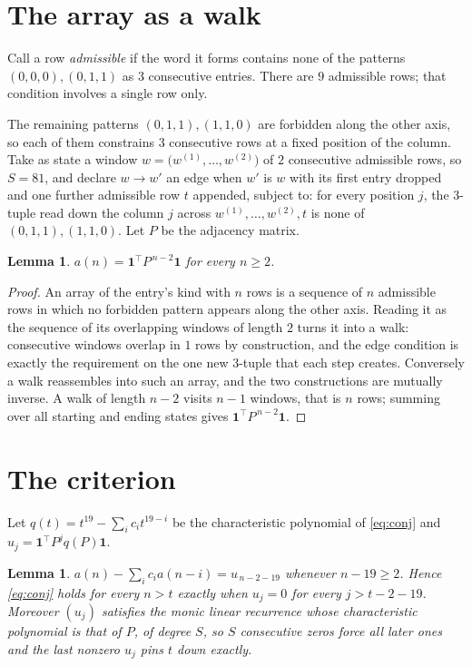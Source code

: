 \documentclass[11pt,a4paper]{article}
\theoremstyle{plain}
\newtheorem{lemma}[theorem]{Lemma}
\theoremstyle{definition}
\begin{document}
\section{The array as a walk}

Call a row \emph{admissible} if the word it forms contains none of the patterns
$(0,0,0), (0,1,1)$ as $3$ consecutive entries. There are $9$ admissible rows; that condition
involves a single row only.

The remaining patterns $(0,1,1), (1,1,0)$ are forbidden along the other axis, so each of them
constrains $3$ consecutive rows at a fixed position of the column. Take as state a
window $w=\bigl(w^{(1)},\dots,w^{(2)}\bigr)$ of $2$ consecutive admissible
rows, so $S=81$, and declare $w\to w'$ an edge when $w'$ is $w$ with its first entry
dropped and one further admissible row $t$ appended, subject to: for every position
$j$, the $3$-tuple read down the column $j$ across $w^{(1)},\dots,w^{(2)},t$
is none of $(0,1,1), (1,1,0)$. Let $P$ be the adjacency matrix.

\begin{lemma}\label{lem:walk}
$a(n)=\mathbf{1}^{\!\top}P^{\,n-2}\mathbf{1}$ for every $n\ge2$.
\end{lemma}

\begin{proof}
An array of the entry's kind with $n$ rows is a sequence of $n$ admissible rows in
which no forbidden pattern appears along the other axis. Reading it as the sequence of its
overlapping windows of length $2$ turns it into a walk: consecutive windows overlap in
$1$ rows by construction, and the edge condition is exactly the requirement on the one
new $3$-tuple that each step creates. Conversely a walk reassembles into such an array,
and the two constructions are mutually inverse. A walk of length $n-2$ visits $n-1$
windows, that is $n$ rows; summing over all starting and ending states gives
$\mathbf{1}^{\!\top}P^{\,n-2}\mathbf{1}$.
\end{proof}

\section{The criterion}

Let $q(t)=t^{19}-\sum_i c_i t^{19-i}$ be the characteristic polynomial of
\eqref{eq:conj} and $u_j=\mathbf{1}^{\!\top}P^{j}q(P)\mathbf{1}$.

\begin{lemma}\label{lem:crit}
$a(n)-\sum_i c_i a(n-i)=u_{\,n-2-19}$ whenever $n-19\ge2$. Hence
\eqref{eq:conj} holds for every $n>t$ exactly when $u_j=0$ for every
$j>t-2-19$. Moreover $(u_j)$ satisfies the monic linear recurrence whose
characteristic polynomial is that of $P$, of degree $S$, so $S$ consecutive zeros force all
later ones and the last nonzero $u_j$ pins $t$ down exactly.
\end{lemma}
\end{document}
